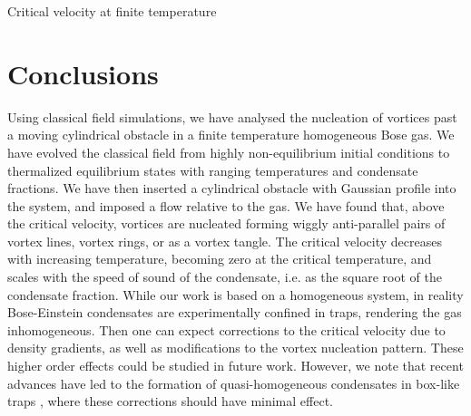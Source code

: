 \begin{chapter}{\label{cha:nonequib}Critical velocity at finite temperature}
\section{Conclusions\label{sec:conclusions}}

Using classical field simulations, we have analysed the nucleation
of vortices past a moving cylindrical obstacle in a finite temperature
homogeneous Bose gas. We have evolved the classical field
from highly non-equilibrium initial conditions to thermalized equilibrium
states with ranging temperatures and condensate fractions.
We have then inserted
a cylindrical obstacle with Gaussian profile into the system, and imposed a flow relative to the gas.  We have found
that, above the critical velocity, vortices are nucleated forming wiggly
anti-parallel pairs of vortex lines, vortex rings, or as a vortex tangle.
The critical velocity decreases with increasing temperature,
becoming zero at the critical temperature, and scales with the speed of
sound of the condensate, i.e. as the square root of the condensate fraction.  While our work is based on a homogeneous system, in reality Bose-Einstein condensates are experimentally confined in traps, rendering the gas inhomogeneous.  Then one can expect corrections to the critical velocity due to density gradients, as well as modifications to the vortex nucleation pattern.  These higher order effects could be studied in future work.  However, we note that recent advances have led to the formation of quasi-homogeneous condensates in box-like traps \cite{gaunt_2013,chomaz_2015}, where these corrections should have minimal effect.
\end{chapter}